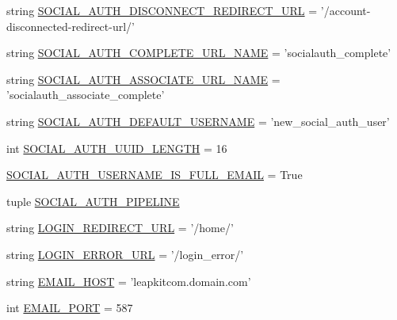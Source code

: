 \begin{DoxyCompactItemize}
string \hyperlink{namespaceleapkit_1_1settings_1_1base__settings_a4908aeeed10644e4da04db1f4a5a2cfc}{S\-O\-C\-I\-A\-L\-\_\-\-A\-U\-T\-H\-\_\-\-D\-I\-S\-C\-O\-N\-N\-E\-C\-T\-\_\-\-R\-E\-D\-I\-R\-E\-C\-T\-\_\-\-U\-R\-L} = '/account-\/disconnected-\/redirect-\/url/'
\item 
string \hyperlink{namespaceleapkit_1_1settings_1_1base__settings_a1010e7b5d358387eb2a4c8e6fd68ed3f}{S\-O\-C\-I\-A\-L\-\_\-\-A\-U\-T\-H\-\_\-\-C\-O\-M\-P\-L\-E\-T\-E\-\_\-\-U\-R\-L\-\_\-\-N\-A\-M\-E} = 'socialauth\-\_\-complete'
\item 
string \hyperlink{namespaceleapkit_1_1settings_1_1base__settings_a1ca69766901e61069927ce36c1ac314f}{S\-O\-C\-I\-A\-L\-\_\-\-A\-U\-T\-H\-\_\-\-A\-S\-S\-O\-C\-I\-A\-T\-E\-\_\-\-U\-R\-L\-\_\-\-N\-A\-M\-E} = 'socialauth\-\_\-associate\-\_\-complete'
\item 
string \hyperlink{namespaceleapkit_1_1settings_1_1base__settings_ad052214c55e8acd02c4a3e55723d67ed}{S\-O\-C\-I\-A\-L\-\_\-\-A\-U\-T\-H\-\_\-\-D\-E\-F\-A\-U\-L\-T\-\_\-\-U\-S\-E\-R\-N\-A\-M\-E} = 'new\-\_\-social\-\_\-auth\-\_\-user'
\item 
int \hyperlink{namespaceleapkit_1_1settings_1_1base__settings_a1b356b9f7033dcc2b44e7ed5aad91dd4}{S\-O\-C\-I\-A\-L\-\_\-\-A\-U\-T\-H\-\_\-\-U\-U\-I\-D\-\_\-\-L\-E\-N\-G\-T\-H} = 16
\item 
\hyperlink{namespaceleapkit_1_1settings_1_1base__settings_a31e1ed7f97cc7b3e6a48e6a26d358233}{S\-O\-C\-I\-A\-L\-\_\-\-A\-U\-T\-H\-\_\-\-U\-S\-E\-R\-N\-A\-M\-E\-\_\-\-I\-S\-\_\-\-F\-U\-L\-L\-\_\-\-E\-M\-A\-I\-L} = True
\item 
tuple \hyperlink{namespaceleapkit_1_1settings_1_1base__settings_a71478629e477f7de45fb42fdd8a26304}{S\-O\-C\-I\-A\-L\-\_\-\-A\-U\-T\-H\-\_\-\-P\-I\-P\-E\-L\-I\-N\-E}
\item 
string \hyperlink{namespaceleapkit_1_1settings_1_1base__settings_a8b805a3cd5b931f74e3eb60d12af04ab}{L\-O\-G\-I\-N\-\_\-\-R\-E\-D\-I\-R\-E\-C\-T\-\_\-\-U\-R\-L} = '/home/'
\item 
string \hyperlink{namespaceleapkit_1_1settings_1_1base__settings_a84a1ee10a68dfcacdb14e8f48b7c6ac3}{L\-O\-G\-I\-N\-\_\-\-E\-R\-R\-O\-R\-\_\-\-U\-R\-L} = '/login\-\_\-error/'
\item 
string \hyperlink{namespaceleapkit_1_1settings_1_1base__settings_a50b733b41267d0e98d8280e3f07e8bbf}{E\-M\-A\-I\-L\-\_\-\-H\-O\-S\-T} = 'leapkitcom.\-domain.\-com'
\item 
int \hyperlink{namespaceleapkit_1_1settings_1_1base__settings_a7889ea19daf43d0406dd9d57730505de}{E\-M\-A\-I\-L\-\_\-\-P\-O\-R\-T} = 587

\end{DoxyCompactItemize}
